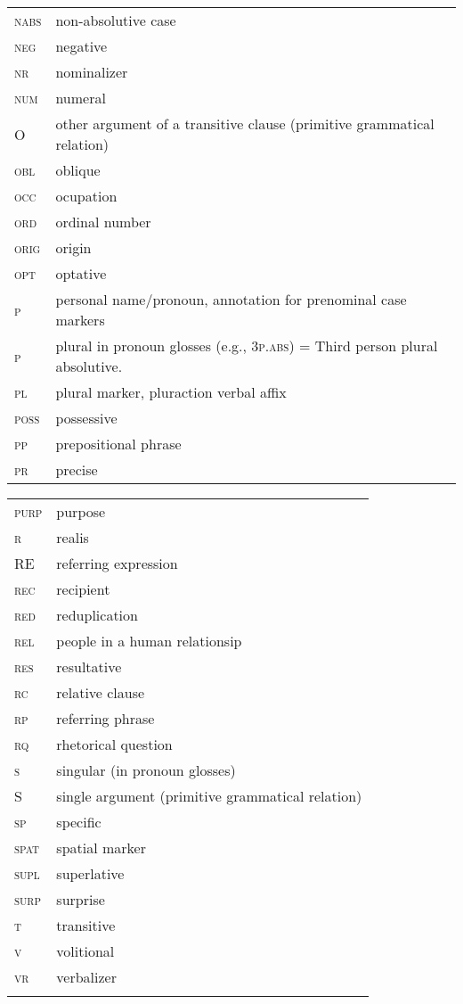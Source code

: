 \begin{tabularx} {.45\textwidth}{>{\scshape}lQ}
nabs       & non-absolutive case \\
neg       & negative \\
nr       & nominalizer \\
num       & numeral \\
O       & other argument of a transitive clause (primitive grammatical relation) \\
obl       & oblique \\
occ       & ocupation  \\
ord       & ordinal number \\
orig       & origin \\
opt       & optative \\
p       & personal name/pronoun, annotation for prenominal case markers \\
p       & plural in pronoun glosses (e.g., 3\textsc{p.abs}) = Third person plural absolutive.\\
pl       & plural marker, pluraction verbal affix \\
poss       & possessive \\
pp       & prepositional phrase \\
pr       & precise \\
\end{tabularx}
\begin{tabularx} {.45\textwidth}{>{\scshape}lQ}
purp       & purpose \\
r       & realis \\
RE      & referring expression \\
rec       & recipient  \\
red       & reduplication \\
rel       & people in a human relationsip \\
res       & resultative \\
rc       & relative clause \\
rp       & referring phrase \\
rq       & rhetorical question \\
s       & singular (in pronoun glosses) \\
S       & single argument (primitive grammatical relation) \\
sp       & specific \\
spat       & spatial marker \\
supl       & superlative \\
surp       & surprise \\
t       & transitive \\
v       & volitional \\
vr       & verbalizer  \\
\\
\end{tabularx}
\bigskip

